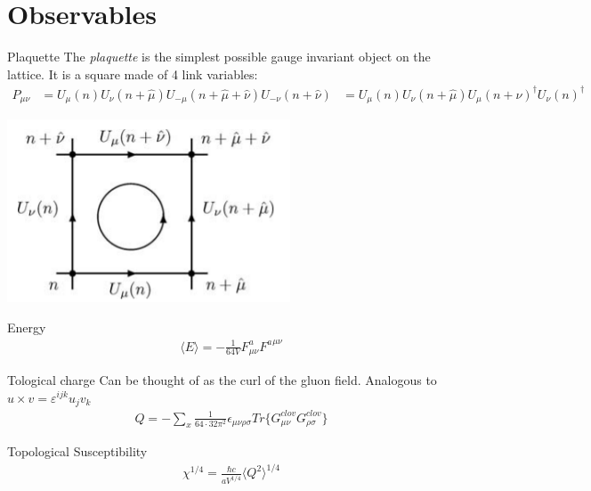 \documentclass[10pt]{beamer}
\begin{document}
\section{Observables}

\begin{frame}{Plaquette}
	The \textit{plaquette} is the simplest possible gauge invariant object on the lattice. It is a square made of 4 link variables:
	\begin{align}
		P_{\mu\nu} &= U_\mu(n)U_\nu(n+\hat{\mu})U_{-\mu}(n+\hat{\mu}+\hat{\nu})U_{-\nu}(n+\hat{\nu}) 
		&= U_\mu(n)U_\nu(n+\hat{\mu})U_{\mu}(n+\hat{\nu})^\dagger U_{\nu}(n)^\dagger
	\end{align}
	\begin{center}
		\includegraphics[scale=0.4]{figures/plaq.png}
	\end{center}
\end{frame}

\begin{frame}{Energy}
	\begin{align}
		\langle E\rangle = -\frac{1}{64V}F_{\mu\nu}^a{F^a}^{\mu\nu}
	\end{align}
\end{frame}

\begin{frame}{Tological charge}
	Can be thought of as the curl of the gluon field. Analogous to $u \times v = \varepsilon^{ijk} u_j v_k$
	\begin{align}
		Q = - \sum_x \frac{1}{64 \cdot 32\pi^2}\epsilon_{\mu\nu\rho\sigma}Tr\{G^{clov}_{\mu\nu}G^{clov}_{\rho\sigma}\}
	\end{align}
\end{frame}

\begin{frame}{Topological Susceptibility}
	\begin{align}
		\chi^{1/4} = \frac{\hbar c}{aV^{1/4}}\langle Q^2 \rangle^{1/4}
	\end{align}
\end{frame}
\end{document}

